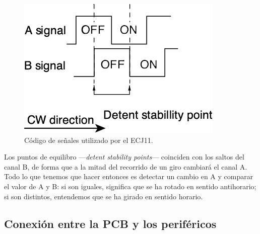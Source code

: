 \begin{figure}[H]
	\noindent \begin{centering}
		\includegraphics[width=\linewidth/3]{capitulo3/rotary}
		\par\end{centering}
	\smallskip
	\caption{\label{fig:rotary} Código de señales utilizado por el ECJ11.}
\end{figure} 

\smallskip

Los puntos de equilibro ---\textit{detent stability points}--- coinciden con los saltos del canal B, de forma que a la mitad del recorrido de un giro cambiará el canal A. Todo lo que tenemos que hacer entonces es detectar un cambio en A y comparar el valor de A y B: si son iguales, significa que se ha rotado en sentido antihorario; si son distintos, entendemos que se ha girado en sentido horario.

\subsection{Conexión entre la PCB y los periféricos}

\smallskip

